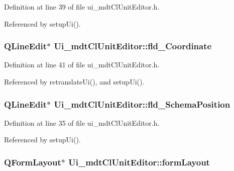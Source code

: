 Definition at line 39 of file ui\-\_\-mdt\-Cl\-Unit\-Editor.\-h.



Referenced by setup\-Ui().

\hypertarget{class_ui__mdt_cl_unit_editor_a685554ff5b320147f4103c6b45226c12}{
\subsubsection[{fld\-\_\-\-Coordinate}]{\setlength{\rightskip}{0pt plus 5cm}Q\-Line\-Edit$\ast$ Ui\-\_\-mdt\-Cl\-Unit\-Editor\-::fld\-\_\-\-Coordinate}}\label{class_ui__mdt_cl_unit_editor_a685554ff5b320147f4103c6b45226c12}


Definition at line 41 of file ui\-\_\-mdt\-Cl\-Unit\-Editor.\-h.



Referenced by retranslate\-Ui(), and setup\-Ui().

\hypertarget{class_ui__mdt_cl_unit_editor_aba5b4004525ad552669be5682ad5b932}{
\subsubsection[{fld\-\_\-\-Schema\-Position}]{\setlength{\rightskip}{0pt plus 5cm}Q\-Line\-Edit$\ast$ Ui\-\_\-mdt\-Cl\-Unit\-Editor\-::fld\-\_\-\-Schema\-Position}}\label{class_ui__mdt_cl_unit_editor_aba5b4004525ad552669be5682ad5b932}


Definition at line 35 of file ui\-\_\-mdt\-Cl\-Unit\-Editor.\-h.



Referenced by setup\-Ui().

\hypertarget{class_ui__mdt_cl_unit_editor_ad0de42e75d2bbf613529a199419ec82b}{
\subsubsection[{form\-Layout}]{\setlength{\rightskip}{0pt plus 5cm}Q\-Form\-Layout$\ast$ Ui\-\_\-mdt\-Cl\-Unit\-Editor\-::form\-Layout}}\label{class_ui__mdt_cl_unit_editor_ad0de42e75d2bbf613529a199419ec82b}


